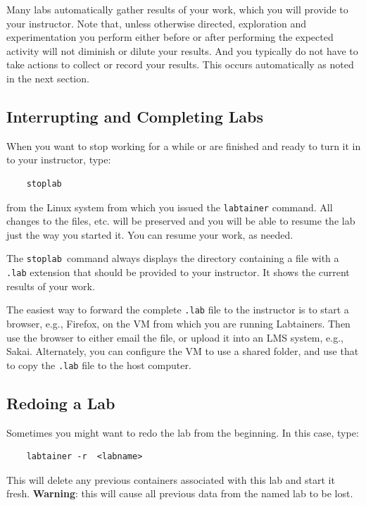 \documentclass[12pt]{article}
\begin{document}
Many labs automatically gather results of your work, which you will provide to your instructor.
Note that, unless otherwise directed, exploration and experimentation you perform either before
or after performing the expected activity will not diminish or dilute your results.  And you typically
do not have to take actions to collect or record your results.  This occurs automatically as noted in the next section.  

\subsection{Interrupting and Completing  Labs}
When you want to stop working for a while or are finished and ready to turn it in to your instructor, type:
\begin{verbatim}
    stoplab
\end{verbatim}

\noindent from the Linux system from which you issued the {\tt labtainer} command. All changes to the files, etc. will be preserved and you will be able to resume the lab just the way you started it. You can resume your work, as needed.

The {\tt stoplab }command always displays the directory containing a file with a {\tt .lab} extension that should be provided to your instructor. It shows the current results of your work. 

The easiest way to forward the complete {\tt .lab} file to the instructor is to start a browser, e.g., Firefox, on the VM from which you
are running Labtainers.  Then use the browser to either email the file, or upload it into an LMS system, e.g., Sakai.
Alternately, you can configure the VM to use a shared folder, and use that to copy the {\tt .lab} file to the host computer.

\subsection{Redoing a Lab}
Sometimes you might want to redo the lab from the beginning.  In this case, type:
\begin{verbatim}
    labtainer -r  <labname>
\end{verbatim}
This will delete any previous containers associated with this lab and start it fresh.  \textbf{Warning}: this will cause all previous data from the named lab to be lost.

\end{document}
